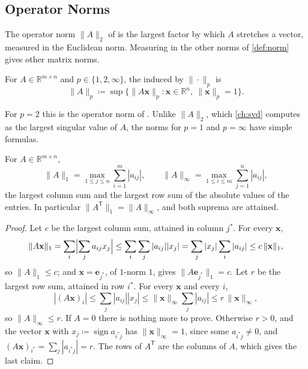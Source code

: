 \subsection{Operator Norms}

The operator norm $\|A\|_2$ of  is the largest factor by which $A$ stretches a vector, measured in the Euclidean norm. Measuring in the other norms of \cref{def:norm} gives other matrix norms.

\begin{definition}
\label{def:operator-norm}
For $A\in\mathbb R^{m\times n}$ and $p\in\{1,2,\infty\}$, the  induced by $\|\cdot\|_p$ is
\[
\|A\|_p\coloneqq\sup\bigl\{\|A\mathbf x\|_p: \mathbf x\in\mathbb R^n,\ \|\mathbf x\|_p=1\bigr\}.
\]
\end{definition}

For $p=2$ this is the operator norm of . Unlike $\|A\|_2$, which \cref{ch:svd} computes as the largest singular value of $A$, the norms for $p=1$ and $p=\infty$ have simple formulas.

\begin{theorem}
\label{thm:norm-formulas}
For $A\in\mathbb R^{m\times n}$,
\[
\|A\|_1=\max_{1\le j\le n}\sum_{i=1}^m|a_{ij}|,\qquad\|A\|_\infty=\max_{1\le i\le m}\sum_{j=1}^n|a_{ij}| ,
\]
the largest column sum and the largest row sum of the absolute values of the entries. In particular $\|A^{\mathsf T}\|_1=\|A\|_\infty$, and both suprema are attained.
\end{theorem}

\begin{proof}
Let $c$ be the largest column sum, attained in column $j^*$. For every $\mathbf x$,
\[
\|A\mathbf x\|_1=\sum_i\Bigl|\sum_ja_{ij}x_j\Bigr|\le\sum_i\sum_j|a_{ij}||x_j|=\sum_j|x_j|\sum_i|a_{ij}|\le c\,\|\mathbf x\|_1 ,
\]
so $\|A\|_1\le c$; and $\mathbf x=\mathbf e_{j^*}$, of $1$-norm $1$, gives $\|A\mathbf e_{j^*}\|_1=c$. Let $r$ be the largest row sum, attained in row $i^*$. For every $\mathbf x$ and every $i$,
\[
|(A\mathbf x)_i|\le\sum_j|a_{ij}||x_j|\le\|\mathbf x\|_\infty\sum_j|a_{ij}|\le r\,\|\mathbf x\|_\infty ,
\]
so $\|A\|_\infty\le r$. If $A=0$ there is nothing more to prove. Otherwise $r>0$, and the vector $\mathbf x$ with $x_j\coloneqq\operatorname{sign}a_{i^*j}$ has $\|\mathbf x\|_\infty=1$, since some $a_{i^*j}\ne0$, and $(A\mathbf x)_{i^*}=\sum_j|a_{i^*j}|=r$. The rows of $A^{\mathsf T}$ are the columns of $A$, which gives the last claim.
\end{proof}

